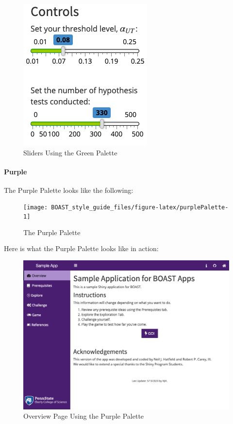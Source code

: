 \documentclass[
]{book}
\begin{document}
\begin{figure}

{\centering \includegraphics{images/colorThemes/greenSliders} 

}

\caption{Sliders Using the Green Palette}\label{fig:greenAction3}
\end{figure}

\hypertarget{purple}{%
\paragraph{Purple}\label{purple}}

The Purple Palette looks like the following:

\begin{figure}

{\centering \texttt{[image: BOAST\_style\_guide\_files/figure-latex/purplePalette-1]} 

}

\caption{The Purple Palette}\label{fig:purplePalette}
\end{figure}

Here is what the Purple Palette looks like in action:

\begin{figure}

{\centering \includegraphics[width=14in]{images/colorThemes/purpleOverview} 

}

\caption{Overview Page Using the Purple Palette}\label{fig:purpleAction1}
\end{figure}
\end{document}
